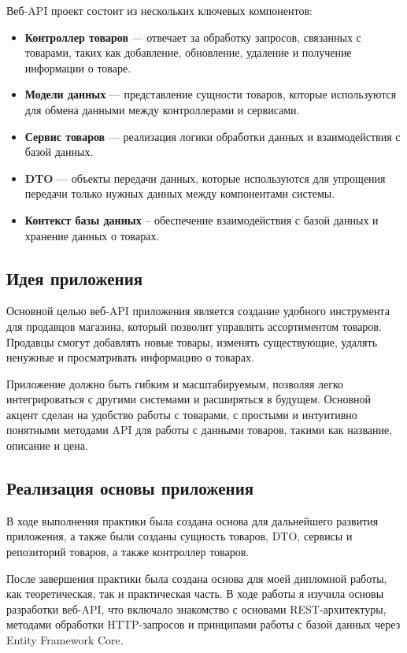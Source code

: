 \documentclass[a4paper,12pt]{report}
\begin{document}
Веб-\ac{API} проект состоит из нескольких ключевых компонентов:
\begin{itemize}
  \item
  \textbf{Контроллер товаров} --- отвечает за обработку запросов, связанных с товарами, таких как добавление, обновление, удаление и получение информации о товаре.
  \item 
  \textbf{Модели данных} --- представление сущности товаров, которые используются для обмена данными между контроллерами и сервисами.
  \item
  \textbf{Сервис товаров} --- реализация логики обработки данных и взаимодействия с базой данных.
  \item
  \textbf{\ac{DTO}} --- объекты передачи данных, которые используются для упрощения передачи только нужных данных между компонентами системы.
  \item
  \textbf{Контекст базы данных} -- обеспечение взаимодействия с базой данных и хранение данных о товарах.
\end{itemize}

\subsection{Идея приложения}

Основной целью веб-\ac{API} приложения является создание удобного инструмента для продавцов магазина, 
который позволит управлять ассортиментом товаров. Продавцы смогут добавлять новые товары, 
изменять существующие, удалять ненужные и просматривать информацию о товарах.

Приложение должно быть гибким и масштабируемым, позволяя легко интегрироваться с другими системами и расширяться в будущем. 
Основной акцент сделан на удобство работы с товарами, с простыми и интуитивно понятными методами \ac{API} для работы с данными товаров, 
такими как название, описание и цена.

\subsection{Реализация основы приложения}

В ходе выполнения практики была создана основа для дальнейшего развития приложения, а также были созданы сущность товаров, DTO, сервисы и репозиторий товаров, 
а также контроллер товаров.


После завершения практики была создана основа для моей дипломной работы, как теоретическая, так и практическая часть. 
В ходе работы я изучила основы разработки веб-\ac{API}, что включало знакомство с основами \ac{REST}-архитектуры, методами обработки 
\ac{HTTP}-запросов и принципами работы с базой данных через Entity Framework Core.
\end{document}
